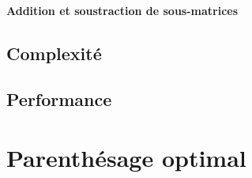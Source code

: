 \documentclass{beamer}
\begin{document}
\begin{frame}
  \framesubtitle{Addition et soustraction de sous-matrices}
\end{frame}
\subsection{Complexité}
\begin{frame}
  \frametitle{\insertsubsection}
\end{frame}


\subsection{Performance}
\begin{frame}
\end{frame}


\section{Parenthésage optimal}
\end{document}
